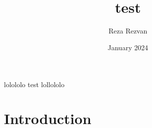 \documentclass{article}
\title{test}
\author{Reza Rezvan}
\date{January 2024}
\begin{document}
\maketitle

lolololo test lollololo

\section{Introduction}
\end{document}
